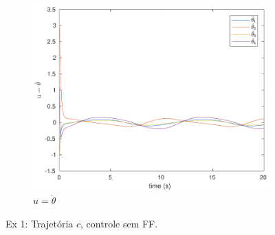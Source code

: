 \documentclass[a4paper,11pt]{article}
\theoremstyle{mytheor}
\begin{document}
\begin{figure}[!ht]
\begin{minipage}{\linewidth}
    \begin{subfigure}[b]{0.4\textwidth}
    \includegraphics[width=1\textwidth]{figs/ex1_c_2_dq.pdf}
    \caption{$u = \dot{\theta}$}
    \label{fig:ex1_c_2_dq}
    \end{subfigure}
  \end{minipage}
\caption{Ex 1: Trajetória $c$, controle sem FF.}
\label{fig:ex1_c_2}
\end{figure}
\end{document}
